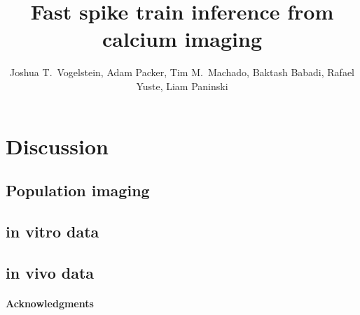  
\usepackage{multicol}
\usepackage{hyperref}
\newcommand{\zzz}{z}
\newcommand{\az}{\argmin_{\bM \bC \geq \ve{0}}}
\newcommand{\anx}{\argmax_{n_t \in \mathbb{N}_0 \forall t}}
\newcommand{\ann}{\argmin_{n_t \in \mathbb{N}_0 \forall t}}
\newcommand{\foopsi}{fast }


\title{Fast spike train inference from calcium imaging}

\author{Joshua T.~Vogelstein, Adam Packer, Tim M.~Machado, Baktash Babadi, Rafael Yuste, Liam Paninski}



\maketitle
\tableofcontents
 



\newpage


\newpage


\newpage
\section{Discussion} \label{sec:dis}


\clearpage\newpage
\subsection{Population imaging} \label{sec:pop}


\clearpage\newpage
\subsection{in vitro data} \label{sec:vitro}


\clearpage\newpage
\subsection{in vivo data} \label{sec:vivo}




\paragraph{Acknowledgments}

